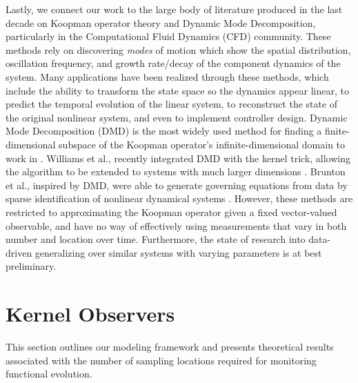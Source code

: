 \documentclass[letterpaper,12pt,peerreviewca,draftcls]{IEEEtran}
\begin{document}
Lastly, we connect our work to the large body of literature produced in the last decade on Koopman operator theory and Dynamic Mode Decomposition, particularly in the Computational Fluid Dynamics (CFD) community. These methods rely on discovering \emph{modes} of motion which show the spatial distribution, oscillation frequency, and growth rate/decay of the component dynamics of the system. Many applications have been realized through these methods, which include the ability to transform the state space so the dynamics appear linear, to predict the temporal evolution of the linear system, to reconstruct the state of the original nonlinear system, and even to implement controller design. Dynamic Mode Decomposition (DMD) is the most widely used method for finding a finite-dimensional subspace of the Koopman operator's infinite-dimensional domain to work in \cite{schmid2010dynamic}. Williams et al., recently integrated DMD with the kernel trick, allowing the algorithm to be extended to systems with much larger dimensions \cite{williams2015kerneldmd}. Brunton et al., inspired by DMD, were able to generate governing equations from data by sparse identification of nonlinear dynamical systems \cite{brunton2016discovering}. However, these methods are restricted to approximating the Koopman operator given a fixed vector-valued observable, and have no way of effectively using measurements that vary in both number and location over time. Furthermore, the state of research into data-driven generalizing over similar systems with varying parameters is at best preliminary.







%

\vspace{-0.1in}
\section{Kernel Observers}\label{sec:observers}

This section outlines our modeling framework and presents theoretical results associated with the number of sampling locations required for monitoring functional evolution. 

%
\end{document}
